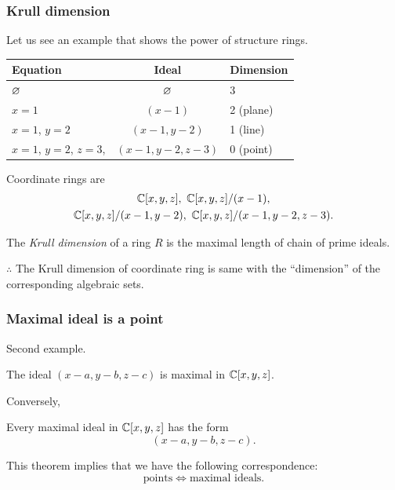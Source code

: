\documentclass[10pt,handout]{beamer}
\begin{document}
\begin{frame}
\frametitle{Krull dimension}
  Let us see an example that shows the power of structure rings.
  \begin{center}
  \begin{tabular}{lcl}
  Equation & Ideal & Dimension \\ \hline
  $\varnothing$ & $\varnothing$ & 3 \\
  $x=1$ & $(x-1)$ & 2 (plane)\\
  $x=1$, $y=2$ & $(x-1,y-2)$ & 1 (line)\\
  $x=1$, $y=2$, $z=3$, & $(x-1,y-2,z-3)$ & 0 (point)
  \end{tabular}
  \end{center}
  \pause
  Coordinate rings are
  \begin{gather*}
    \mathbb{C}[x,y,z],\ \mathbb{C}[x,y,z]/(x-1),\\
    \mathbb{C}[x,y,z]/(x-1,y-2),\ \mathbb{C}[x,y,z]/(x-1,y-2,z-3).
  \end{gather*}
  \begin{defn}
    The \emph{Krull dimension} of a ring $R$ is the maximal length of chain of prime ideals.
  \end{defn}
  $\therefore$ The Krull dimension of coordinate ring is same with the ``dimension'' of the corresponding algebraic sets.
\end{frame}

\begin{frame}
\frametitle{Maximal ideal is a point}
  Second example.
  \begin{thm}
  The ideal $(x-a,y-b,z-c)$ is maximal in $\mathbb{C}[x,y,z]$.
  \end{thm}
  \pause Conversely,
  \begin{thm}
    Every maximal ideal in $\mathbb{C}[x,y,z]$ has the form
    \[(x-a,y-b,z-c).\]
  \end{thm}
  \pause This theorem implies that we have the following correspondence:
  \[\text{points}\iff\text{maximal ideals}.\]
\end{frame}
\end{document}
